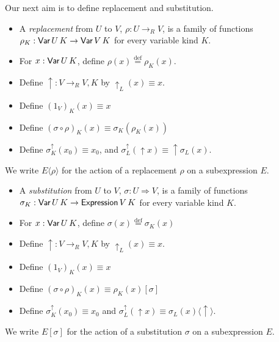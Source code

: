 \documentclass[envcountsame]{llncs}
\newcommand{\eqdef}{\ensuremath{\stackrel{\mathrm{def}}{=}}}
\begin{document}
Our next aim is to define replacement and substitution.  

\begin{definition}[Replacement]
 \begin{itemize}
  \item A \emph{replacement} from $U$ to $V$, $\rho : U \rightarrow_R V$, is a family of functions $\rho_K : \AgdaDatatype{Var} \, U \, K \rightarrow
  \AgdaDatatype{Var} \, V \, K$ for every variable kind $K$.
  \item For $x : \AgdaDatatype{Var} \, U \, K$, define $\rho(x) \eqdef \rho_K(x)$.
  \item Define $\uparrow : V \rightarrow_R V , K$ by $\uparrow_L(x) \equiv x$.
  \item Define $(1_V)_K(x) \equiv x$
  \item Define $(\sigma \circ \rho)_K (x) \equiv \sigma_K (\rho_K(x))$
  \item Define $\sigma^\uparrow_K(x_0) \equiv x_0$, and $\sigma^\uparrow_L(\uparrow x) \equiv \uparrow \sigma_L(x)$.
\end{itemize}
\end{definition}

We write $E \langle \rho \rangle$ for the action of a replacement $\rho$ on a subexpression $E$.

\begin{definition}[Substitution]
 \begin{itemize}
  \item A \emph{substitution} from $U$ to $V$, $\sigma : U \Rightarrow V$, is a family of functions $\sigma_K : \AgdaDatatype{Var} \, U \, K \rightarrow
  \AgdaDatatype{Expression} \, V \, K$ for every variable kind $K$.
  \item For $x : \AgdaDatatype{Var} \, U \, K$, define $\sigma(x) \eqdef \sigma_K(x)$
  \item Define $\uparrow : V \rightarrow_R V , K$ by $\uparrow_L(x) \equiv x$.
  \item Define $(1_V)_K(x) \equiv x$
  \item Define $(\sigma \circ \rho)_K(x) \equiv \rho_K(x) [ \sigma ]$
  \item Define $\sigma^\uparrow_K(x_0) \equiv x_0$ and $\sigma^\uparrow_L(\uparrow x) \equiv \sigma_L(x) \langle \uparrow \rangle$.
 \end{itemize}
\end{definition}

We write $E [ \sigma ]$ for the action of a substitution $\sigma$ on a subexpression $E$.
\end{document}
